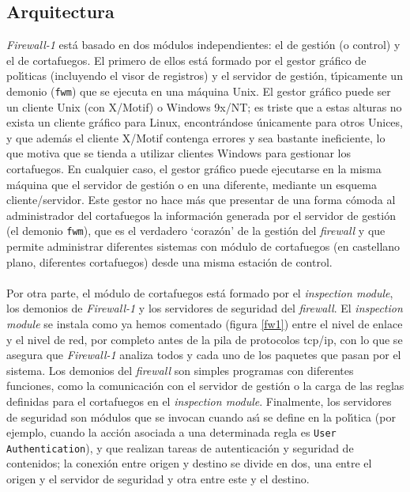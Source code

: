 \subsection{Arquitectura}
{\it Firewall-1} est\'a basado en dos m\'odulos independientes: el de gesti\'on
(o control)
y el de cortafuegos. El primero de ellos est\'a formado por el gestor gr\'afico
de pol\'{\i}ticas (incluyendo el visor de registros) y el servidor de gesti\'on,
t\'{\i}picamente un demonio ({\tt fwm}) que se ejecuta en una m\'aquina Unix. El
gestor gr\'afico puede ser un cliente Unix (con X/Motif) o Windows 9x/NT; es
triste que a estas alturas no exista un cliente gr\'afico para Linux, 
encontr\'andose \'unicamente para otros Unices, y que adem\'as el cliente 
X/Motif contenga errores y sea bastante ineficiente, lo que motiva que se 
tienda a utilizar clientes Windows para gestionar los cortafuegos. En cualquier 
caso, el gestor gr\'afico puede ejecutarse en la misma m\'aquina que el 
servidor de gesti\'on o en una diferente, mediante un esquema cliente/servidor. 
Este gestor no hace m\'as que presentar de una forma c\'omoda al administrador 
del cortafuegos la informaci\'on generada por el servidor de gesti\'on (el 
demonio {\tt fwm}), que es el verdadero `coraz\'on' de la gesti\'on del {\it 
firewall} y que permite administrar diferentes sistemas con m\'odulo de 
cortafuegos (en castellano plano, diferentes cortafuegos) desde una misma 
estaci\'on de control.\\
\\Por otra parte, el m\'odulo de cortafuegos est\'a formado por el {\it 
inspection module}, los demonios de {\it Firewall-1} y los servidores de 
seguridad del {\it firewall}. El {\it inspection module} se instala como ya
hemos comentado (figura \ref{fw1}) entre el nivel de enlace y el nivel de red, 
por completo antes de la pila de protocolos {\sc tcp/ip}, con lo que se asegura
que {\it Firewall-1} analiza todos y cada uno de los paquetes que pasan por el
sistema. Los demonios del {\it firewall} son simples programas con diferentes
funciones, como la comunicaci\'on con el servidor de gesti\'on o la carga de las
reglas definidas para el cortafuegos en el {\it inspection module}. Finalmente, 
los servidores de seguridad son m\'odulos que se invocan cuando 
as\'{\i} se define en la pol\'{\i}tica (por ejemplo, cuando la acci\'on asociada
a una determinada regla es {\tt User Authentication}), y que realizan tareas
de autenticaci\'on y seguridad de contenidos; la conexi\'on entre origen y 
destino se divide en dos, una entre el origen y el servidor de seguridad y otra
entre este y el destino.
